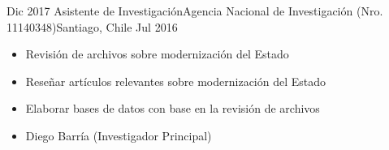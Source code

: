 \begin{experiences}
  \emptySeparator 
  \experience 
    {Dic 2017} {Asistente de Investigación}{Agencia Nacional de Investigación (Nro. 11140348)}{Santiago, Chile} {Jul 2016}
    {\begin{itemize}
    \item Revisión de archivos sobre modernización del Estado
    \item Reseñar artículos relevantes sobre modernización del Estado
    \item Elaborar bases de datos con base en la revisión de archivos
    \item Diego Barría {\small (Investigador Principal)}
    \end{itemize}}
    {}
\end{experiences}
\vspace{-2mm}

